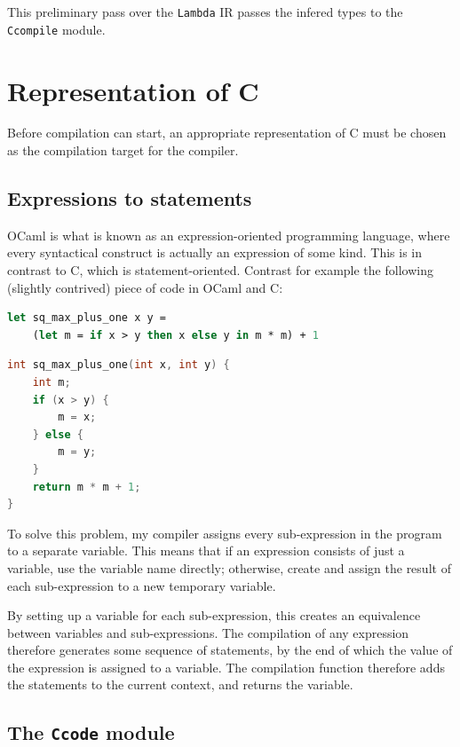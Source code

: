 \documentclass[12pt,a4paper,twoside,openright]{report}
\begin{document}
This preliminary pass over the \texttt{Lambda} IR passes the infered types to
the \texttt{Ccompile} module.

\section{Representation of C}

Before compilation can start, an appropriate representation of C must be chosen 
as the compilation target for the compiler.

\subsection{Expressions to statements} \label{expr-stmt}

OCaml is what is known as an expression-oriented programming language, where
every syntactical construct is actually an expression of some kind. This is in
contrast to C, which is statement-oriented. Contrast for example the following
(slightly contrived) piece of code in OCaml and C:

\begin{lstlisting}[language=Caml]
let sq_max_plus_one x y =
    (let m = if x > y then x else y in m * m) + 1
\end{lstlisting}

\begin{lstlisting}[language=C]
int sq_max_plus_one(int x, int y) {
    int m;
    if (x > y) {
        m = x;
    } else {
        m = y;
    }
    return m * m + 1;
}
\end{lstlisting}

To solve this problem, my compiler assigns every sub-expression in the program
to a separate variable. This means that if an expression consists of just a
variable, use the variable name directly; otherwise, create and assign the
result of each sub-expression to a new temporary variable.

By setting up a variable for each sub-expression, this creates an equivalence
between variables and sub-expressions. The compilation of any expression
therefore generates some sequence of statements, by the end of which the value
of the expression is assigned to a variable. The compilation function therefore
adds the statements to the current context, and returns the variable. 

\subsection{The \texttt{Ccode} module}
\end{document}
